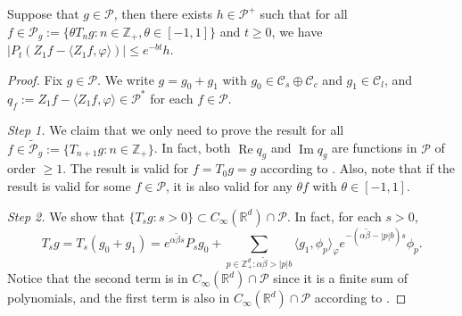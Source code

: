 \documentclass[EJP]{ejpecp} %
\begin{document}
\begin{lemma}
\label{lem:P:R}
	Suppose that $g \in \mathcal P$, then there exists $h \in \mathcal P^+$ such that for all $ f \in \mathcal P_g := \{\theta T_n g: n \in \mathbb Z_+, \theta \in [-1,1]\} $ and $t\geq 0$, we have $ | P_t (Z_1 f - \langle Z_1 f, \varphi \rangle )| \leq e^{-bt} h$.
\end{lemma}
\begin{proof}
	Fix $g \in \mathcal P$.
	We write  $g = g_0 + g_1$ with $g_0 \in \mathcal C_s \oplus \mathcal C_c$ and $g_1 \in \mathcal C_l$,  and $q_f:=Z_1f - \langle Z_1f, \varphi \rangle\in \mathcal P^*$ for each $f\in \mathcal P$.
	
	\emph{Step 1.} We claim  that we only need to prove the result for all $f \in \widetilde{\mathcal P}_g:= \{T_{n+1} g : n \in \mathbb Z_+\}$.
  	In fact, both $\operatorname{Re} q_g$ and $\operatorname{Im} q_g$ are functions in $\mathcal P$ of order $\geq 1$.
  	The result is valid for $f = T_0 g = g$ according to \cite[Fact 1.2]{MarksMilos2018CLT}.
  	Also, note that if the result is valid for some $f \in \mathcal P$, it is also valid for any $\theta f$ with $\theta \in [-1,1]$.

	\emph{Step 2.} We show that $\{T_s g: s> 0\} \subset C_\infty (\mathbb R^d) \cap \mathcal P$.
	In fact, for each $s > 0$,
\[
    T_s g
    = T_s (g_0 + g_1)
    = e^{\alpha \tilde \beta s}P_s g_0 + \sum_{p \in \mathbb Z_+^d: \alpha \tilde \beta > |p|b} 
    \langle g_1, \phi_p \rangle_\varphi e^{-(\alpha \tilde \beta - |p|b)s} \phi_p.
\]
	Notice that the second term is in $C_\infty(\mathbb R^d)\cap \mathcal P$ since it is a finite sum of polynomials, and the first term is also in $C_\infty (\mathbb R^d) \cap \mathcal P$ according to \cite[Fact 1.1]{MarksMilos2018CLT}.


\end{proof}
\end{document}
